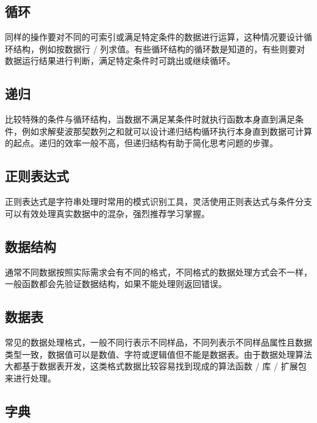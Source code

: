 \documentclass[
]{book}
\begin{document}
\hypertarget{ux5faaux73af}{%
\subsection{循环}\label{ux5faaux73af}}

同样的操作要对不同的可索引或满足特定条件的数据进行运算，这种情况要设计循环结构，例如按数据行 / 列求值。有些循环结构的循环数是知道的，有些则要对数据运行结果进行判断，满足特定条件时可跳出或继续循环。

\hypertarget{ux9012ux5f52}{%
\subsection{递归}\label{ux9012ux5f52}}

比较特殊的条件与循环结构，当数据不满足某条件时就执行函数本身直到满足条件，例如求解斐波那契数列之和就可以设计递归结构循环执行本身直到数据可计算的起点。递归的效率一般不高，但递归结构有助于简化思考问题的步骤。

\hypertarget{ux6b63ux5219ux8868ux8fbeux5f0f}{%
\subsection{正则表达式}\label{ux6b63ux5219ux8868ux8fbeux5f0f}}

正则表达式是字符串处理时常用的模式识别工具，灵活使用正则表达式与条件分支可以有效处理真实数据中的混杂，强烈推荐学习掌握。

\hypertarget{ux6570ux636eux7ed3ux6784}{%
\subsection{数据结构}\label{ux6570ux636eux7ed3ux6784}}

通常不同数据按照实际需求会有不同的格式，不同格式的数据处理方式会不一样，一般函数都会先验证数据结构，如果不能处理则返回错误。

\hypertarget{ux6570ux636eux8868}{%
\subsection{数据表}\label{ux6570ux636eux8868}}

常见的数据处理格式，一般不同行表示不同样品，不同列表示不同样品属性且数据类型一致，数据值可以是数值、字符或逻辑值但不能是数据表。由于数据处理算法大都基于数据表开发，这类格式数据比较容易找到现成的算法函数 / 库 / 扩展包来进行处理。

\hypertarget{ux5b57ux5178}{%
\subsection{字典}\label{ux5b57ux5178}}
\end{document}
